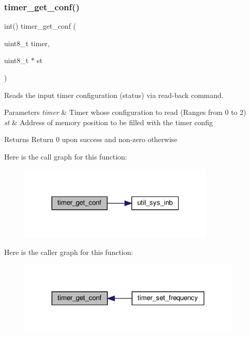 \subsubsection{\texorpdfstring{timer\+\_\+get\+\_\+conf()}{timer\_get\_conf()}}
{\footnotesize\ttfamily int() timer\+\_\+get\+\_\+conf (\begin{DoxyParamCaption}\item[{uint8\+\_\+t}]{timer,  }\item[{uint8\+\_\+t $\ast$}]{st }\end{DoxyParamCaption})}



Reads the input timer configuration (status) via read-\/back command. 


\begin{DoxyParams}{Parameters}
{\em timer} & Timer whose configuration to read (Ranges from 0 to 2) \\
\hline
{\em st} & Address of memory position to be filled with the timer config \\
\hline
\end{DoxyParams}
\begin{DoxyReturn}{Returns}
Return 0 upon success and non-\/zero otherwise 
\end{DoxyReturn}
Here is the call graph for this function\+:\nopagebreak
\begin{figure}[H]
\begin{center}
\leavevmode
\includegraphics[width=265pt]{group__timer_ga703c60b40c8c49607d6ecb6fef82d27a_cgraph}
\end{center}
\end{figure}
Here is the caller graph for this function\+:\nopagebreak
\begin{figure}[H]
\begin{center}
\leavevmode
\includegraphics[width=302pt]{group__timer_ga703c60b40c8c49607d6ecb6fef82d27a_icgraph}
\end{center}
\end{figure}
\mbox{\label{group__timer_ga91a2072306c68353712a6b771287dc2c}} 
